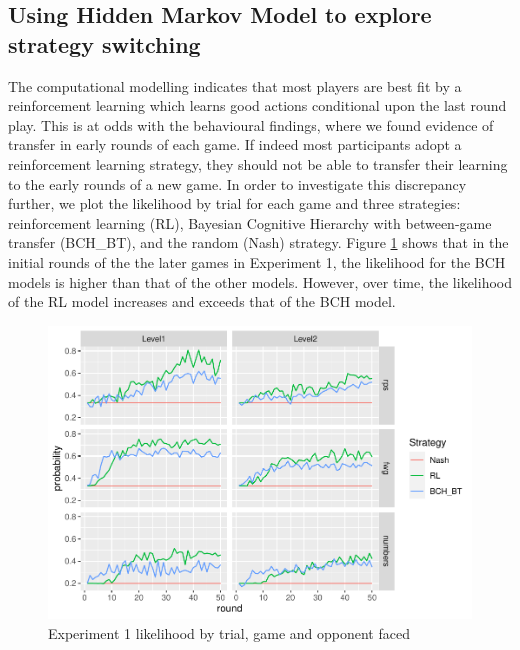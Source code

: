 \documentclass[smallextended]{svjour3}       %
\begin{document}
\hypertarget{using-hidden-markov-model-to-explore-strategy-switching}{%
\subsection{Using Hidden Markov Model to explore strategy
switching}\label{using-hidden-markov-model-to-explore-strategy-switching}}

The computational modelling indicates that most players are best fit by
a reinforcement learning which learns good actions conditional upon the
last round play. This is at odds with the behavioural findings, where we
found evidence of transfer in early rounds of each game. If indeed most
participants adopt a reinforcement learning strategy, they should not be
able to transfer their learning to the early rounds of a new game. In
order to investigate this discrepancy further, we plot the likelihood by
trial for each game and three strategies: reinforcement learning (RL),
Bayesian Cognitive Hierarchy with between-game transfer (BCH\_BT), and
the random (Nash) strategy. Figure \ref{fig:exp1-lik-by-tr} shows that
in the initial rounds of the the later games in Experiment 1, the
likelihood for the BCH models is higher than that of the other models.
However, over time, the likelihood of the RL model increases and exceeds
that of the BCH model.

\begin{figure}

{\centering \includegraphics[width=\textwidth]{CBB_v2_files/figure-latex/exp1-lik-by-tr-1} 

}

\caption{Experiment 1 likelihood by trial, game and opponent faced}\label{fig:exp1-lik-by-tr}
\end{figure}
\end{document}
